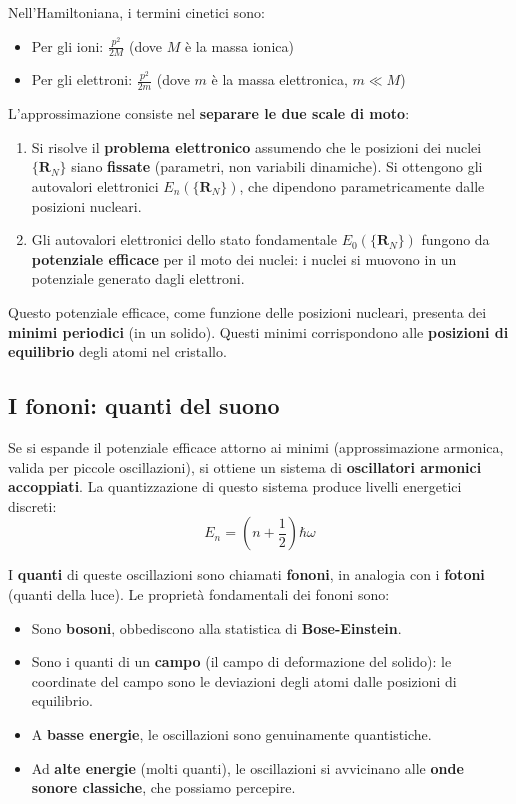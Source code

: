 Nell'Hamiltoniana, i termini cinetici sono:
\begin{itemize}
    \item Per gli ioni: $\frac{p^2}{2M}$ (dove $M$ è la massa ionica)
    \item Per gli elettroni: $\frac{p^2}{2m}$ (dove $m$ è la massa elettronica, $m \ll M$)
\end{itemize}

L'approssimazione consiste nel \textbf{separare le due scale di moto}:

\begin{enumerate}
    \item Si risolve il \textbf{problema elettronico} assumendo che le posizioni dei nuclei $\{\mathbf{R}_N\}$ siano \textbf{fissate} (parametri, non variabili dinamiche). Si ottengono gli autovalori elettronici $E_n(\{\mathbf{R}_N\})$, che dipendono parametricamente dalle posizioni nucleari.
    \item Gli autovalori elettronici dello stato fondamentale $E_0(\{\mathbf{R}_N\})$ fungono da \textbf{potenziale efficace} per il moto dei nuclei: i nuclei si muovono in un potenziale generato dagli elettroni.
\end{enumerate}

Questo potenziale efficace, come funzione delle posizioni nucleari, presenta dei \textbf{minimi periodici} (in un solido). Questi minimi corrispondono alle \textbf{posizioni di equilibrio} degli atomi nel cristallo.

\subsection{I fononi: quanti del suono}

Se si espande il potenziale efficace attorno ai minimi (approssimazione armonica, valida per piccole oscillazioni), si ottiene un sistema di \textbf{oscillatori armonici accoppiati}. La quantizzazione di questo sistema produce livelli energetici discreti:
\begin{equation}
E_n = \left(n + \frac{1}{2}\right)\hbar\omega
\end{equation}

I \textbf{quanti} di queste oscillazioni sono chiamati \textbf{fononi}, in analogia con i \textbf{fotoni} (quanti della luce). Le proprietà fondamentali dei fononi sono:

\begin{itemize}
    \item Sono \textbf{bosoni}, obbediscono alla statistica di \textbf{Bose-Einstein}.
    \item Sono i quanti di un \textbf{campo} (il campo di deformazione del solido): le coordinate del campo sono le deviazioni degli atomi dalle posizioni di equilibrio.
    \item A \textbf{basse energie}, le oscillazioni sono genuinamente quantistiche.
    \item Ad \textbf{alte energie} (molti quanti), le oscillazioni si avvicinano alle \textbf{onde sonore classiche}, che possiamo percepire.
\end{itemize}


